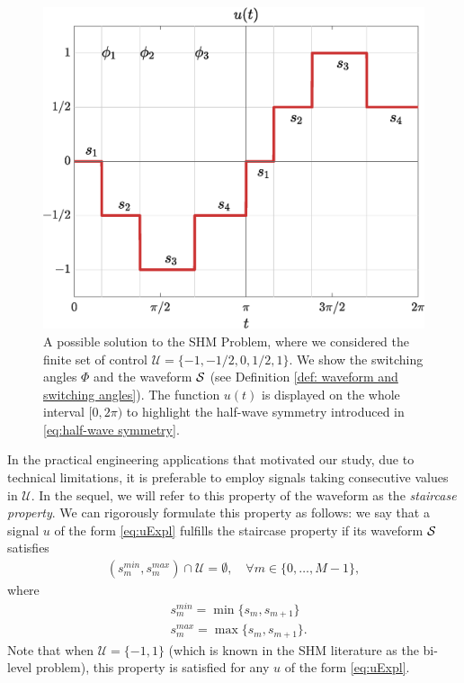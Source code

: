 \documentclass[twocolumn]{autart}    %
\begin{document}
\begin{figure}[h]
	\centering
	\includegraphics[scale=0.35]{img/fig01.eps} 
	\caption{A possible solution to the SHM Problem, where we considered the finite set of control $\mathcal{U} = \{-1, -1/2, 0, 1/2, 1\}$. We show the switching angles $\Phi$ and the waveform $\mathcal{S}$ (see Definition \ref{def: waveform and switching angles}). The function $u(t)$ is displayed on the whole interval $[0,2\pi)$ to highlight the half-wave symmetry introduced in \eqref{eq:half-wave symmetry}.}
	\label{fig:exampleSHE}
\end{figure}

In the practical engineering applications that motivated our study, due to technical limitations, it is preferable to employ signals taking consecutive values in $\mathcal{U}$. In the sequel, we will refer to this property of the waveform as the \emph{staircase property}. We can rigorously formulate this property as follows: we say that a signal $u$ of the form \eqref{eq:uExpl} fulfills the staircase property if its waveform $\mathcal{S}$ satisfies
\begin{gather}\label{eq:staircase prop}
	(s_m^{min},s_{m}^{max}) \cap \mathcal{U} = \emptyset, \quad \forall m\in \{ 0, \ldots, M-1 \},
\end{gather}
where 
\begin{align*}
	&s^{min}_m = \min\{s_m,s_{m+1}\} 
	\\[5pt]
	&s^{max}_m = \max\{s_m,s_{m+1}\}.
\end{align*}
Note that when $\mathcal{U} = \{-1,1\}$ (which is known in the SHM literature as the bi-level problem), this property is satisfied for any $u$ of the form \eqref{eq:uExpl}.
\end{document}
